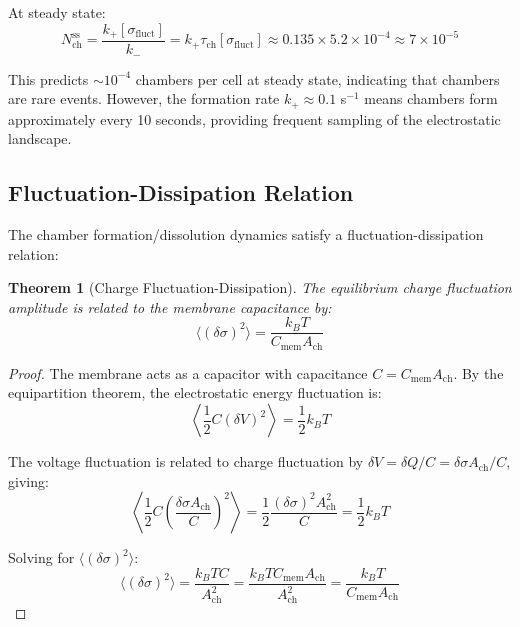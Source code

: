 \documentclass[twocolumn,10pt,aps,prd,superscriptaddress,floatfix,nofootinbib]{revtex4-2}
\newtheorem{theorem}{Theorem}[section]
\theoremstyle{remark}
\begin{document}
At steady state:
\begin{equation}
N_{\mathrm{ch}}^{\mathrm{ss}} = \frac{k_+[\sigma_{\mathrm{fluct}}]}{k_-} = k_+ \tau_{\mathrm{ch}} [\sigma_{\mathrm{fluct}}] \approx 0.135 \times 5.2 \times 10^{-4} \approx 7 \times 10^{-5}
\end{equation}

This predicts $\sim 10^{-4}$ chambers per cell at steady state, indicating that chambers are rare events. However, the formation rate $k_+ \approx 0.1$ s$^{-1}$ means chambers form approximately every 10 seconds, providing frequent sampling of the electrostatic landscape.

\subsection{Fluctuation-Dissipation Relation}

The chamber formation/dissolution dynamics satisfy a fluctuation-dissipation relation:

\begin{theorem}[Charge Fluctuation-Dissipation]
\label{thm:fluctuation_dissipation}
The equilibrium charge fluctuation amplitude is related to the membrane capacitance by:
\begin{equation}
\langle(\delta\sigma)^2\rangle = \frac{k_B T}{C_{\mathrm{mem}} A_{\mathrm{ch}}}
\label{eq:fluctuation_dissipation}
\end{equation}
\end{theorem}

\begin{proof}
The membrane acts as a capacitor with capacitance $C = C_{\mathrm{mem}} A_{\mathrm{ch}}$. By the equipartition theorem, the electrostatic energy fluctuation is:
\begin{equation}
\left\langle\frac{1}{2}C(\delta V)^2\right\rangle = \frac{1}{2}k_B T
\end{equation}

The voltage fluctuation is related to charge fluctuation by $\delta V = \delta Q / C = \delta\sigma A_{\mathrm{ch}} / C$, giving:
\begin{equation}
\left\langle\frac{1}{2}C\left(\frac{\delta\sigma A_{\mathrm{ch}}}{C}\right)^2\right\rangle = \frac{1}{2}\frac{(\delta\sigma)^2 A_{\mathrm{ch}}^2}{C} = \frac{1}{2}k_B T
\end{equation}

Solving for $\langle(\delta\sigma)^2\rangle$:
\begin{equation}
\langle(\delta\sigma)^2\rangle = \frac{k_B T C}{A_{\mathrm{ch}}^2} = \frac{k_B T C_{\mathrm{mem}} A_{\mathrm{ch}}}{A_{\mathrm{ch}}^2} = \frac{k_B T}{C_{\mathrm{mem}} A_{\mathrm{ch}}}
\end{equation}
\end{proof}
\end{document}
